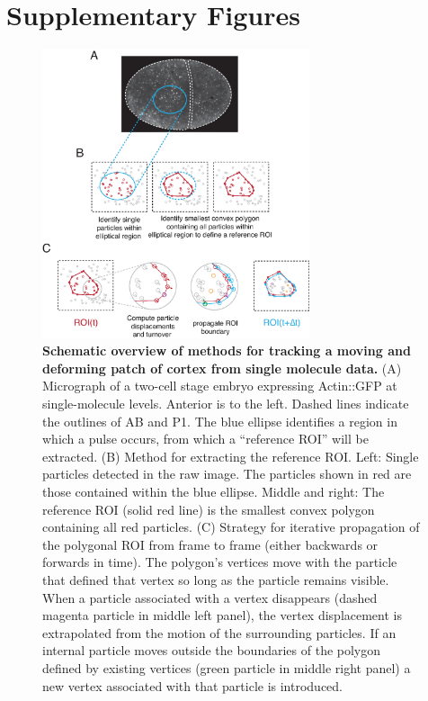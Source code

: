 \newpage





\section{Supplementary Figures}

\begin{figure}[!htbp]
\centering
\includegraphics[width=0.7\textwidth]{pulse/Figure2-10}

\caption[Schematic overview of methods for tracking a moving and deforming patch of cortex from single molecule data.]{\label{fig:2210} \textbf{Schematic overview of methods for tracking a moving and deforming patch of cortex from single molecule data.} (A) Micrograph of a two-cell stage embryo expressing Actin::GFP at single-molecule levels. Anterior is to the left.  Dashed lines indicate the outlines of AB and P1.  The blue ellipse identifies a region in which a pulse occurs, from which a ``reference ROI'' will be extracted. (B) Method for extracting the reference ROI. Left:  Single particles detected in the raw image.  The particles shown in red are those contained within the blue ellipse.  Middle and right: The reference ROI (solid red line) is the smallest convex polygon containing all red particles. (C) Strategy for iterative propagation of the polygonal ROI from frame to frame (either backwards or forwards in time).  The polygon’s vertices move with the particle that defined that vertex so long as the particle remains visible. When a particle associated with a vertex disappears (dashed magenta particle in middle left panel), the vertex displacement is extrapolated from the motion of the surrounding particles. If an internal particle moves outside the boundaries of the polygon defined by existing vertices (green particle in middle right panel) a new vertex associated with that particle is introduced.}
\end{figure}




